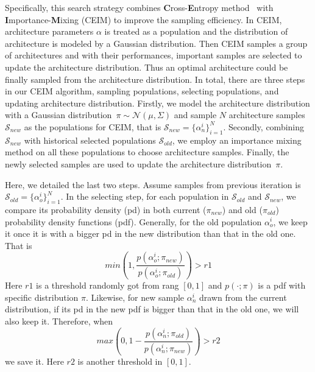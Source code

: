 \documentclass[letterpaper]{article} \usepackage{aaai19}  \usepackage{times}  \usepackage{helvet} \usepackage{courier}  \usepackage[hyphens]{url}  \usepackage{graphicx} \urlstyle{rm} \def\UrlFont{\rm}  \usepackage{graphicx}  \frenchspacing  \setlength{\pdfpagewidth}{8.5in}  \setlength{\pdfpageheight}{11in}
\begin{document}
Specifically, this search strategy combines \textbf{C}ross-\textbf{E}ntropy method~\cite{larranaga2001estimation} with \textbf{I}mportance-\textbf{M}ixing (CEIM) to improve the sampling efficiency. In CEIM, architecture parameters $\alpha$ is treated as a population and the distribution of architecture is modeled by a Gaussian distribution. Then CEIM samples a group of architectures and with their performances, important samples are selected to update the architecture distribution. Thus an optimal architecture could be finally sampled from the architecture distribution. 
In total, there are three steps in our CEIM algorithm, sampling populations, selecting populations, and updating architecture distribution. Firstly, we model the architecture distribution with a Gaussian distribution~$\pi \sim \mathcal{N}(\mu, \Sigma)$ and sample $N$ architecture samples $\mathcal{S}_{new}$ as the populations for CEIM, that is $\mathcal{S}_{new}=\{\alpha_n^i\}_{i=1}^{N}$. Secondly, combining $\mathcal{S}_{new}$ with historical selected populations $\mathcal{S}_{old}$, we employ an importance mixing method on all these populations to choose architecture samples. Finally, the newly selected samples are used to update the architecture distribution~$\pi$. 

Here, we detailed the last two steps. Assume samples from previous iteration is $\mathcal{S}_{
old}=\{\alpha_o^i\}_{i=1}^{N}$. In the selecting step, for each population in $\mathcal{S}_{old}$ and $\mathcal{S}_{new}$, we compare its probability density (pd) in both current ($\pi_{new}$) and old ($\pi_{old}$) probability density functions (pdf). Generally, for the old population $\alpha_{o}^i$, we keep it once it is with a bigger pd in the new distribution than that in the old one. That is 
\begin{equation}\label{eq:old sample}
     min(1, \frac{p(\alpha_{o}^{i};\pi_{new})}{p(\alpha_{o}^{i};\pi_{old})})>r1
\end{equation}
Here $r1$ is a threshold randomly got from rang $[0,1]$ and $p(\cdot;\pi)$ is a pdf with specific distribution $\pi$. Likewise, for new sample $\alpha_{n}^i$ drawn from the current distribution, if its pd in the new pdf is bigger than that in the old one, we will also keep it. Therefore, when 
\begin{equation}\label{eq:new sample}
     max(0, 1-\frac{p(\alpha_{n}^{i};\pi_{old})}{p(\alpha_{n}^{i};\pi_{new})})> r2
\end{equation}
we save it. Here $r2$ is another threshold in $[0,1]$.
\end{document}
